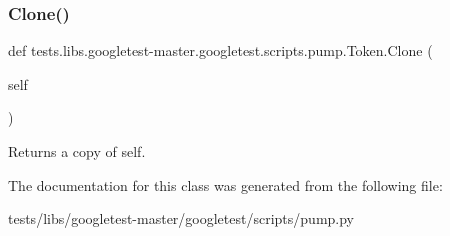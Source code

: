 \subsubsection{\texorpdfstring{Clone()}{Clone()}}
{\footnotesize\ttfamily def tests.\+libs.\+googletest-\/master.\+googletest.\+scripts.\+pump.\+Token.\+Clone (\begin{DoxyParamCaption}\item[{}]{self }\end{DoxyParamCaption})}

\begin{DoxyVerb}Returns a copy of self.\end{DoxyVerb}
 

The documentation for this class was generated from the following file\+:\begin{DoxyCompactItemize}
\item 
tests/libs/googletest-\/master/googletest/scripts/pump.\+py\end{DoxyCompactItemize}
